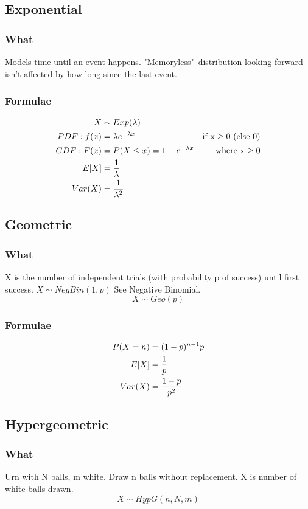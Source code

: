 \documentclass[12pt]{amsart}
\begin{document}
\subsection{Exponential}
\subsubsection{What}
Models time until an event happens. "Memoryless"--distribution looking forward isn't affected by how long since the last event.
\subsubsection{Formulae}
\begin{align*}
X &\sim Exp(\lambda) \\
PDF: f(x) &= \lambda e^{-\lambda x} & \text{if x} \geq 0 \text{ (else 0)} \\
CDF: F(x) &= P(X \leq x) = 1 - e^{-\lambda x} & \text{where x} \geq 0 \\
E[X] &= {1 \over \lambda} \\
Var(X) &= {1 \over \lambda^2}
\end{align*}
%
\subsection{Geometric}
\subsubsection{What}
X is the number of independent trials (with probability p of success) until first success. $X \sim NegBin(1, p)$ See Negative Binomial.
\[
X \sim Geo(p)
\]
\subsubsection{Formulae}
\begin{align*}
P(X = n) &= (1-p)^{n-1} p \\
E[X] &= {1 \over p} \\
Var(X) &= {1 - p \over p^2}
\end{align*}
%
\subsection{Hypergeometric}
\subsubsection{What}
Urn with N balls, m white. Draw n balls without replacement. X is number of white balls drawn.
\[
X \sim HypG(n, N, m)
\]
\end{document}
